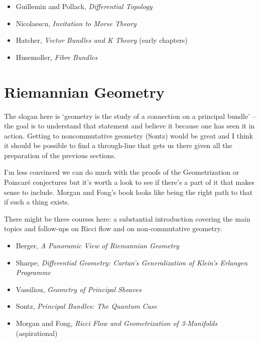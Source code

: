 \documentclass[article]{article}
\begin{document}
\begin{itemize}
	\item[]{Guillemin and Pollack, \textit{Differential Topology}}
	\item[]{Nicolaescu, \textit{Invitation to Morse Theory}}
	\item[]{Hatcher, \textit{Vector Bundles and K Theory} (early chapters)}
	\item[]{Husemoller, \textit{Fibre Bundles}}
\end{itemize}

\section{Riemannian Geometry}

The slogan here is `geometry is the study of a connection on a principal bundle' -- the goal is to understand that statement and believe it because one has seen it in action. Getting to noncommutative geometry (Sontz) would be great and I think it should be possible to find a through-line that gets us there given all the preparation of the previous sections. 

I'm less convinced we can do much with the proofs of the Geometrization or Poincar\'e conjectures but it's worth a look to see if there's a part of it that makes sense to include. Morgan and Fong's book looks like being the right path to that if such a thing exists.

There might be three courses here: a substantial introduction covering the main topics and follow-ups on Ricci flow and on non-commutative geometry.

\begin{itemize}
	\item[]{Berger, \textit{A Panoramic View of Riemannian Geometry}}
	\item[]{Sharpe, \textit{Differential Geometry: Cartan's Generalization of Klein's Erlangen Programme}}
	\item[]{Vassiliou, \textit{Geometry of Principal Sheaves}}
	\item[]{Sontz, \textit{Principal Bundles: The Quantum Case}}
	\item[]{Morgan and Fong, \textit{Ricci Flow and Geometrization of 3-Manifolds} (aspirational)}
\end{itemize}
\end{document}
